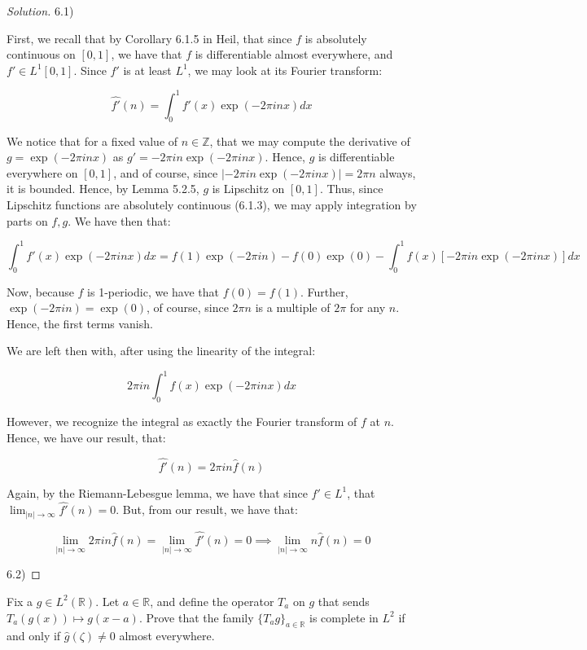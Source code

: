 \documentclass[10pt]{article}
\newenvironment{problem}[2][]{\begin{trivlist}
\item[\hskip \labelsep {\bfseries #1}\hskip \labelsep {\bfseries #2.}]}{\end{trivlist}}
\begin{document}
\begin{proof}[Solution]

6.1)

First, we recall that by Corollary 6.1.5 in Heil, that since $f$ is absolutely continuous on $[0,1]$, we have that $f$ is differentiable almost everywhere, and $f' \in L^1[0,1]$. Since $f'$ is at least $L^1$, we may look at its Fourier transform:

$$ \hat{f'}(n) = \int_0^1 f'(x) \exp(-2\pi i n x) dx $$

We notice that for a fixed value of $n \in \mathbb{Z}$, that we may compute the derivative of $g =\exp(-2 \pi i nx)$ as $g' =- 2 \pi i n\exp(-2\pi i nx) $. Hence, $g$ is differentiable everywhere on $[0,1]$, and of course, since $|- 2 \pi i n\exp(-2\pi i nx)| = 2\pi n$ always, it is bounded. Hence, by Lemma 5.2.5, $g$ is Lipschitz on $[0,1]$. Thus, since Lipschitz functions are absolutely continuous (6.1.3), we may apply integration by parts on $f, g$. We have then that:

$$ \int_0^1 f'(x) \exp(-2\pi i nx ) dx = f(1) \exp(-2\pi i n) - f(0) \exp(0) - \int_0^1 f(x) [ - 2 \pi i n \exp(-2\pi i nx)] dx $$

Now, because $f$ is 1-periodic, we have that $f(0) = f(1)$. Further, $\exp(-2\pi in ) = \exp(0)$, of course, since $2\pi n$ is a multiple of $2\pi $ for any $n$. Hence, the first terms vanish.

We are left then with, after using the linearity of the integral:

$$ 2 \pi i n \int_0^1 f(x) \exp(- 2 \pi i nx) dx $$

However, we recognize the integral as exactly the Fourier transform of $f$ at $n$. Hence, we have our result, that:

$$ \hat{f'}(n) = 2 \pi in \hat{f}(n) $$

Again, by the Riemann-Lebesgue lemma, we have that since $f' \in L^1$, that $\lim_{|n| \to \infty} \hat{f'}(n) = 0 $. But, from our result, we have that:

$$ \lim_{|n| \to \infty} 2 \pi i n \hat{f}(n) = \lim_{|n| \to \infty} \hat{f'}(n) =  0 \implies \lim_{|n| \to \infty} n \hat{f}(n) = 0 $$

6.2)





\end{proof}

\begin{problem}{Question 12}

Fix a $g \in L^2(\mathbb{R})$. Let $a \in \mathbb{R}$, and define the operator $T_a$ on $g$ that sends $T_a (g(x)) \mapsto g(x - a)$. Prove that the family $\{ T_ag \}_{a \in \mathbb{R}}$ is complete in $L^2$ if and only if $\hat{g}(\zeta) \not = 0$ almost everywhere.

\end{problem}
\end{document}
